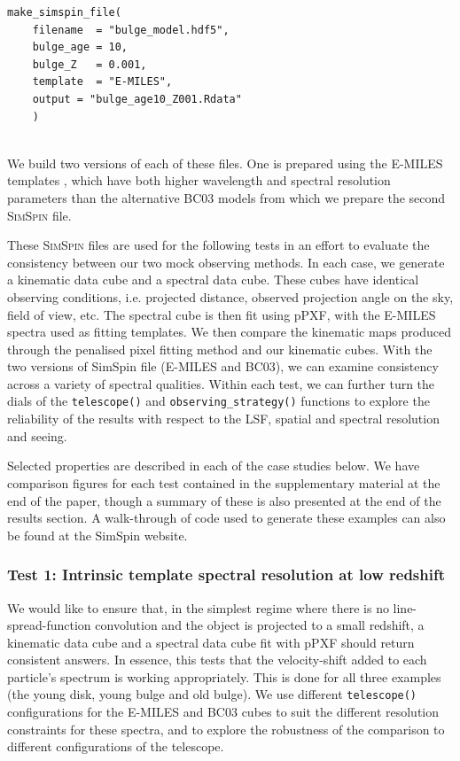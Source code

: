 \documentclass[
  journal=pasa,
  manuscript=research-paper, %
  year=2020,
  volume=37,
]{cup-journal}
\newcommand{\simspin}[1]{\textsc{SimSpin}#1} %
\newcommand{\telescope}[1]{\texttt{telescope()}#1}
\newcommand{\observingstrategy}[1]{\texttt{observing\_strategy()}#1}
\begin{document}
\begin{lstlisting}[basicstyle=\fontsize{10}{8}\selectfont\ttfamily]
make_simspin_file(
    filename  = "bulge_model.hdf5", 
    bulge_age = 10, 
    bulge_Z   = 0.001, 
    template  = "E-MILES",
    output = "bulge_age10_Z001.Rdata"
    )
                  
\end{lstlisting}

We build two versions of each of these files. 
One is prepared using the \textsc{E-MILES} templates \citep{Vazdekis2016UV-extendedGalaxies}, which have both higher wavelength and spectral resolution parameters than the alternative BC03 models \citep{Bruzual2003Stellar2003} from which we prepare the second \simspin{} file.  

These \simspin{} files are used for the following tests in an effort to evaluate the consistency between our two mock observing methods.
In each case, we generate a kinematic data cube and a spectral data cube.
These cubes have identical observing conditions, i.e. projected distance, observed projection angle on the sky, field of view, etc. 
The spectral cube is then fit using pPXF, with the E-MILES spectra used as fitting templates.
We then compare the kinematic maps produced through the penalised pixel fitting method and our kinematic cubes. 
With the two versions of SimSpin file (\textsc{E-MILES} and \textsc{BC03}), we can examine consistency across a variety of spectral qualities.
Within each test, we can further turn the dials of the \telescope{} and \observingstrategy{} functions to explore the reliability of the results with respect to the LSF, spatial and spectral resolution and seeing.

Selected properties are described in each of the case studies below. 
We have comparison figures for each test contained in the supplementary material at the end of the paper, though a summary of these is also presented at the end of the results section. 
A walk-through of code used to generate these examples can also be found at the SimSpin website. 

\subsubsection*{Test 1: Intrinsic template spectral resolution at low redshift}

We would like to ensure that, in the simplest regime where there is no line-spread-function convolution and the object is projected to a small redshift, a kinematic data cube and a spectral data cube fit with pPXF should return consistent answers. 
In essence, this tests that the velocity-shift added to each particle's spectrum is working appropriately. 
This is done for all three examples (the young disk, young bulge and old bulge). 
We use different \telescope{} configurations for the E-MILES and \textsc{BC03} cubes to suit the different resolution constraints for these spectra, and to explore the robustness of the comparison to different configurations of the telescope. 
\end{document}
